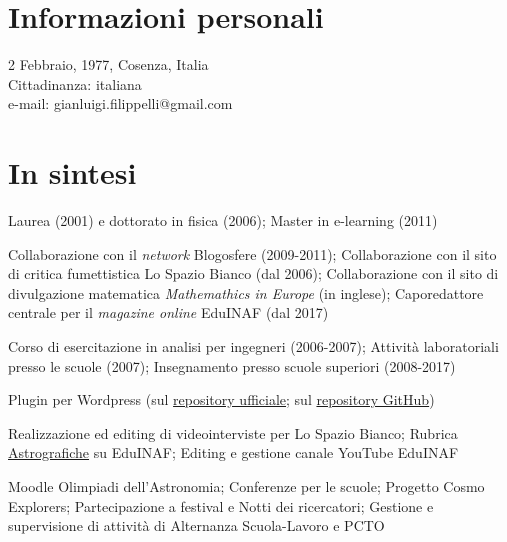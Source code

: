 \section{Informazioni personali}

\begin{flushleft}
	2 Febbraio, 1977, Cosenza, Italia\\
	Cittadinanza: italiana\\
	e-mail: gianluigi.filippelli@gmail.com\\
\end{flushleft}

\section{In sintesi}

\begin{CV}
	
	\item[Titolo di studio:] Laurea (2001) e dottorato in fisica (2006); Master in e-learning (2011)
	\item[Esperienze editoriali:] Collaborazione con il \emph{network} Blogosfere (2009-2011); Collaborazione con il sito di critica fumettistica Lo Spazio Bianco (dal 2006); Collaborazione con il sito di divulgazione matematica \emph{Mathemathics in Europe} (in inglese); Caporedattore centrale per il\emph{ magazine online} EduINAF (dal 2017)
	\item[Esperienze didattiche:] Corso di esercitazione in analisi per ingegneri (2006-2007); Attivit\`a laboratoriali presso le scuole (2007); Insegnamento presso scuole superiori (2008-2017)
	\item[Programmazione:] Plugin per Wordpress (sul \href{https://profiles.wordpress.org/ulaulaman/}{repository ufficiale}; sul \href{https://github.com/ulaulaman}{repository GitHub})
	\item[Grafica e video:] Realizzazione ed editing di videointerviste per Lo Spazio Bianco; Rubrica \href{https://edu.inaf.it/category/rubriche/astrografiche/}{Astrografiche} su EduINAF; Editing e gestione canale YouTube EduINAF
	\item[Attivit\`a INAF:] Moodle Olimpiadi dell'Astronomia; Conferenze per le scuole; Progetto Cosmo Explorers; Partecipazione a festival e Notti dei ricercatori; Gestione e supervisione di attivit\`a di Alternanza Scuola-Lavoro e PCTO
\end{CV}

